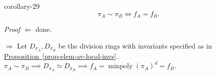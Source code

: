 \documentclass[10pt,]{book}
\makeatletter
\renewcommand*{\proofname}{Proof}
\renewenvironment{proof}[1][\proofname]{\par
  \pushQED{\qed}%
  \normalfont \topsep6\p@\@plus6\p@\relax
  \trivlist
  \item\relax
    {\itshape
    #1\@addpunct{.}}\hspace\labelsep\ignorespaces
}{%
  \popQED\endtrivlist\@endpefalse
}
\numberwithin{equation}{section}
\makeatother
\begin{document}
\begin{corollary}{}{}{corollary-29}%
\hypertarget{p-428}{}%
%
\begin{equation*}
\pi_A\sim \pi_B \iff f_A = f_B\text{.}
\end{equation*}
%
\end{corollary}
\begin{proof}\hypertarget{proof-73}{}
\hypertarget{p-429}{}%
\(\Leftarrow\) done.%
\par
\hypertarget{p-430}{}%
\(\Rightarrow\) Let \(D_{\pi_A} , D_{\pi_B}\) be the division rings with invariants specified as in \hyperref[prop-elem-av-local-invs]{Proposition~\ref{prop-elem-av-local-invs}}. \(\pi_A\sim \pi_B \implies D_{\pi_A} \simeq D_{\pi_B} \implies f_A = \operatorname{minpoly}(\pi_A) ^d = f_B\).%
\end{proof}
%
%
\typeout{************************************************}
\typeout{************************************************}
%
\end{document}
